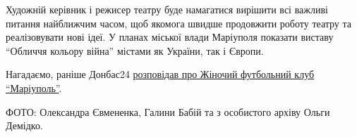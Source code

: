 Художній керівник і режисер театру буде намагатися вирішити всі важливі питання
найближчим часом, щоб якомога швидше продовжити роботу театру та реалізовувати
нові ідеї. У планах міської влади Маріуполя показати виставу \enquote{Обличчя кольору
війна} містами як України, так і Європи.


Нагадаємо, раніше Донбас24
\href{https://donbas24.news/news/zinocii-futbolnii-klub-mariupol-nasa-meta-predstavlyati-ridne-misto-na-cempionati-ukrayini}{розповідав
про Жіночий футбольний клуб \enquote{Маріуполь}}.

ФОТО: Олександра Євмененка, Галини Бабій та з особистого архіву Ольги Демідко.

\clearpage
{}
